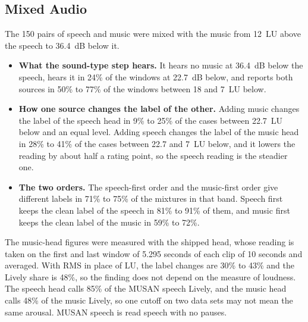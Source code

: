 \subsection{Mixed Audio}
\label{sec:ai-mixed}
The 150 pairs of speech and music were mixed with the music from 12~LU above the speech to 36.4~dB below it.
\begin{itemize}
    \item \textbf{What the sound-type step hears.} It hears no music at 36.4~dB below the speech, hears it in 24\% of the windows at 22.7~dB below, and reports both sources in 50\% to 77\% of the windows between 18 and 7~LU below.
    \item \textbf{How one source changes the label of the other.} Adding music changes the label of the speech head in 9\% to 25\% of the cases between 22.7~LU below and an equal level. Adding speech changes the label of the music head in 28\% to 41\% of the cases between 22.7 and 7~LU below, and it lowers the reading by about half a rating point, so the speech reading is the steadier one.
    \item \textbf{The two orders.} The speech-first order and the music-first order give different labels in 71\% to 75\% of the mixtures in that band. Speech first keeps the clean label of the speech in 81\% to 91\% of them, and music first keeps the clean label of the music in 59\% to 72\%.
\end{itemize}
The music-head figures were measured with the shipped head, whose reading is taken on the first and last window of 5.295 seconds of each clip of 10 seconds and averaged. With RMS in place of LU, the label changes are 30\% to 43\% and the Lively share is 48\%, so the finding does not depend on the measure of loudness. The speech head calls 85\% of the MUSAN speech Lively, and the music head calls 48\% of the music Lively, so one cutoff on two data sets may not mean the same arousal. MUSAN speech is read speech with no pauses.

